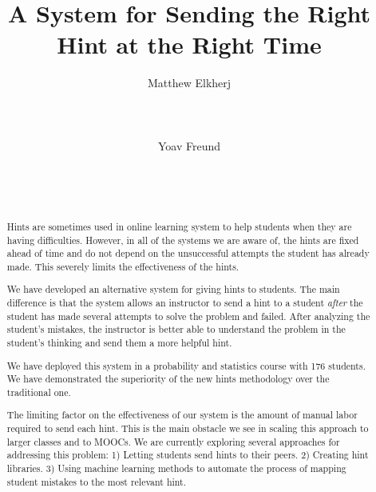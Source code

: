 \documentclass{sigchi}
\begin{document}
\title{A System for Sending the Right Hint at the Right Time}

\author{
  \alignauthor Matthew Elkherj\\
    \\
    \\
    \\
  \alignauthor Yoav Freund\\
    \\
    \\
    \\
}

\maketitle

\begin{abstract}
Hints are sometimes used in online learning system to help students
when they are having difficulties. However, in all of the systems we
are aware of, the hints are fixed ahead of time and do not depend on
the unsuccessful attempts the student has already made. This severely
limits the effectiveness of the hints.

We have developed an alternative system for giving hints to
students. The main difference is that the system allows an instructor
to send a hint to a student {\em after} the student has
made several attempts to solve the problem and failed.  After
analyzing the student's mistakes, the instructor is better able to
understand the problem in the student's thinking and send them a more
helpful hint.

We have deployed this system in a probability and statistics course
with 176 students. We have demonstrated the superiority of the new
hints methodology over the traditional one.

The limiting factor on the effectiveness of our system is the amount
of manual labor required to send each hint. This is the main obstacle
we see in scaling this approach to larger classes and to MOOCs. We
are currently exploring several approaches for addressing this
problem: 1) Letting students send hints to their peers. 2) Creating
hint libraries. 3) Using machine learning methods to automate
the process of mapping student mistakes to the most relevant hint.

\end{abstract}
\end{document}
